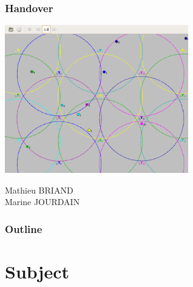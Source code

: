 \documentclass{beamer}
\begin{document}
\begin{frame}
\frametitle{Handover}
\begin{center}
  \includegraphics[width=0.6\textwidth]{./images/capture.png}
\end{center}

Mathieu BRIAND \\
Marine JOURDAIN

\end{frame}


\begin{frame}
\frametitle{Outline}
\tableofcontents

\end{frame}

\section{Subject}
\end{document}
